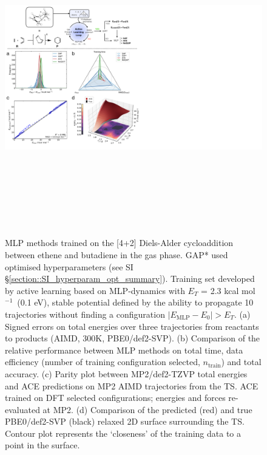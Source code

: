 \documentclass[twoside,twocolumn,9pt]{article}
\newcommand{\kcal}{kcal mol$^{-1}$}
\begin{document}
\begin{figure}[tb]
	\centering
	\includegraphics[height=13.7cm]{figX1}
	\caption{MLP methods trained on the [4+2] Diels-Alder cycloaddition between ethene and butadiene in the gas phase. GAP* used optimised hyperparameters (see SI §\ref{section::SI_hyperparam_opt_summary}). Training set developed by active learning based on MLP-dynamics with $E_T$ = 2.3 \kcal~(0.1 eV), stable potential defined by the ability to propagate 10 trajectories without finding a configuration $|E_\text{MLP} - E_0| > E_T$. (a) Signed errors on total energies over three trajectories from reactants to products (AIMD, 300K, PBE0/def2-SVP). (b) Comparison of the relative performance between MLP methods on total time, data efficiency (number of training configuration selected, $n_\text{train}$) and total accuracy. (c) Parity plot between MP2/def2-TZVP total energies and ACE predictions on MP2 AIMD trajectories from the TS. ACE trained on DFT selected configurations; energies and forces re-evaluated at MP2. (d) Comparison of the predicted (red) and true PBE0/def2-SVP (black) relaxed 2D surface surrounding the TS. Contour plot represents the ‘closeness’ of the training data to a point in the surface.}
	\label{fig::X1}
\end{figure}
\end{document}
